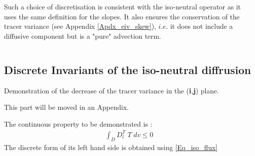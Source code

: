 \documentclass[NEMO_book]{subfiles}
\begin{document}
Such a choice of discretisation is consistent with the iso-neutral operator as it uses the 
same definition for the slopes. It also ensures the conservation of the tracer variance 
(see Appendix \ref{Apdx_eiv_skew}), $i.e.$ it does not include a diffusive component 
but is a "pure" advection term.




$\ $\newpage      %
\subsection{Discrete Invariants of the iso-neutral diffrusion}
\label{Apdx_Gf_operator}

Demonstration of the decrease of the tracer variance in the (\textbf{i},\textbf{j}) plane. 

This part will be moved in an Appendix.

The continuous property to be demonstrated is :
\begin{align*}
\int_D  D_l^T \; T \;dv   \leq 0
\end{align*}
The discrete form of its left hand side is obtained using \eqref{Eq_iso_flux}
\end{document}

